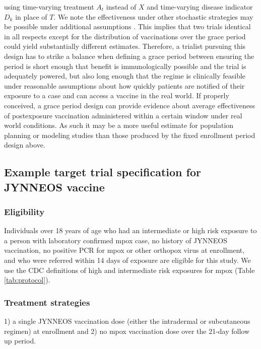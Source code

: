 \begin{appendices}
\begin{refsection}
    using time-varying treatment $A_t$ instead of $X$ and time-varying disease indicator $D_k$ in place of $T$. We note the effectiveness under other stochastic strategies may be possible under additional assumptions \cite{wanis_role_2022}. This implies that two trials identical in all respects except for the distribution of vaccinations over the grace period could yield substantially different estimates. Therefore, a trialist pursuing this design has to strike a balance when defining a grace period between ensuring the period is short enough that benefit is immunologically possible and the trial is adequately powered, but also long enough that the regime is clinically feasible under reasonable assumptions about how quickly patients are notified of their exposure to a case and can access a vaccine in the real world. If properly conceived, a grace period design can provide evidence about average effectiveness of postexposure vaccination administered within a certain window under real world conditions. As such it may be a more useful estimate for population planning or modeling studies than those produced by the fixed enrollment period design above. 
    
    \clearpage
    \subsection{Example target trial specification for JYNNEOS vaccine}\label{sec:trial_spec}
    \subsubsection*{Eligibility}

    Individuals over 18 years of age who had an intermediate or high risk exposure to a person with laboratory confirmed mpox case, no history of JYNNEOS vaccination, no positive PCR for mpox or other orthopox virus at enrollment, and who were referred within 14 days of exposure are eligible for this study. We use the CDC definitions of high and intermediate risk exposures \cite{cdc_mpox_2022} for mpox (Table \ref{tab:protocol}).

    \subsubsection*{Treatment strategies}
    1) a single JYNNEOS vaccination dose (either the intradermal or subcutaneous regimen) at enrollment and 2) no mpox vaccination dose over the 21-day follow up period. 


\end{refsection}
\end{appendices}
